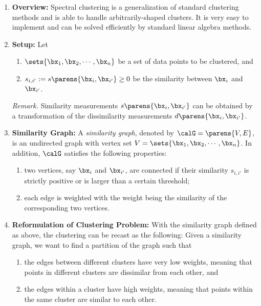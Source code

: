 \documentclass[12pt]{article}
\begin{document}
\begin{enumerate}[label=\textbf{\arabic*.}]
	
	\item \textbf{Overview:} Spectral clustering is a generalization of standard clustering methods and is able to handle arbitrarily-shaped clusters. It is very easy to implement and can be solved efficiently by standard linear algebra methods. 
	
	\item \textbf{Setup:} Let 
	\begin{enumerate}
		\item $\sets{\bx_1, \bx_2, \cdots, \bx_n}$ be a set of data points to be clustered, and 
		\item $s_{i, {i'}} := s \parens{\bx_i, \bx_{i'}} \ge 0$ be the similarity between $\bx_i$ and $\bx_{i'}$. 
	\end{enumerate}
	
	\textit{Remark.} Similarity measurements $s \parens{\bx_i, \bx_{i'}}$ can be obtained by a transformation of the dissimilarity measurements $d \parens{\bx_i, \bx_{i'}}$. 
	
	\item \textbf{Similarity Graph:} A \emph{similarity graph}, denoted by $\calG = \parens{V, E}$, is an undirected graph with vertex set $V = \sets{\bx_1, \bx_2, \cdots, \bx_n}$. In addition, $\calG$ satisfies the following properties: 
	\begin{enumerate}
		\item two vertices, say $\bx_i$ and $\bx_{i'}$, are connected if their similarity $s_{i,i'}$ is strictly positive or is larger than a certain threshold; 
		\item each edge is weighted with the weight being the similarity of the corresponding two vertices. 
	\end{enumerate}
	
	\item \textbf{Reformulation of Clustering Problem:}	With the similarity graph defined as above, the clustering can be recast as the following: Given a similarity graph, we want to find a partition of the graph such that 
	\begin{enumerate}
		\item the edges between different clusters have very low weights, meaning that points in different clusters are dissimilar from each other, and 
		\item the edges within a cluster have high weights, meaning that points within the same cluster are similar to each other. 
	\end{enumerate}
	

\end{enumerate}
\end{document}
